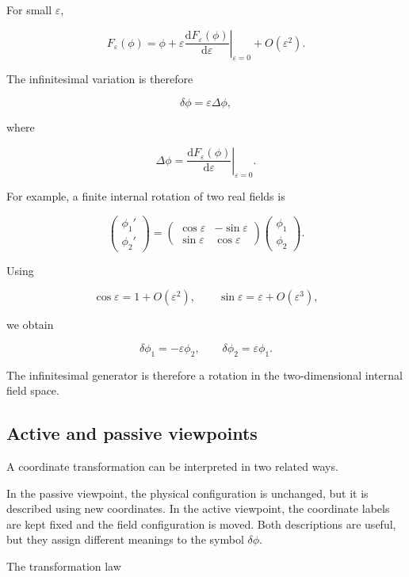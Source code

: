 For small \(\varepsilon\),

\[
F_{\varepsilon}(\phi)
=
\phi
+
\varepsilon
\left.
\frac{\mathrm{d}F_{\varepsilon}(\phi)}
{\mathrm{d}\varepsilon}
\right|_{\varepsilon=0}
+
O(\varepsilon^{2}).
\]

The infinitesimal variation is therefore

\[
\delta\phi
=
\varepsilon \Delta\phi,
\]

where

\[
\Delta\phi
=
\left.
\frac{\mathrm{d}F_{\varepsilon}(\phi)}
{\mathrm{d}\varepsilon}
\right|_{\varepsilon=0}.
\]

For example, a finite internal rotation of two real fields is

\[
\begin{pmatrix}
\phi_1'\\
\phi_2'
\end{pmatrix}
=
\begin{pmatrix}
\cos\varepsilon & -\sin\varepsilon\\
\sin\varepsilon & \cos\varepsilon
\end{pmatrix}
\begin{pmatrix}
\phi_1\\
\phi_2
\end{pmatrix}.
\]

Using

\[
\cos\varepsilon
=
1+O(\varepsilon^{2}),
\qquad
\sin\varepsilon
=
\varepsilon+O(\varepsilon^{3}),
\]

we obtain

\[
\delta\phi_1
=
-\varepsilon\phi_2,
\qquad
\delta\phi_2
=
\varepsilon\phi_1.
\]

The infinitesimal generator is therefore a rotation in the two-dimensional internal field space.

\subsection{Active and passive viewpoints}

A coordinate transformation can be interpreted in two related ways.

In the passive viewpoint, the physical configuration is unchanged, but it is described using new coordinates. In the active viewpoint, the coordinate labels are kept fixed and the field configuration is moved. Both descriptions are useful, but they assign different meanings to the symbol \(\delta\phi\).

The transformation law

